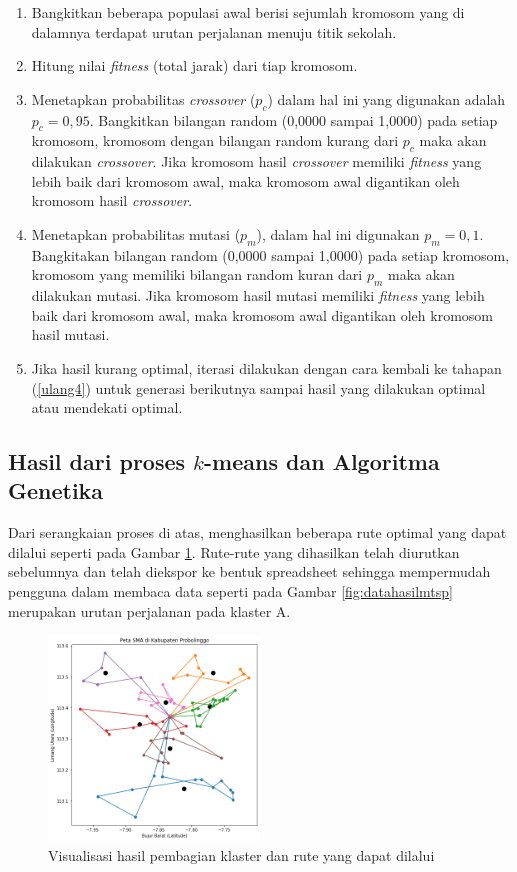 \begin{enumerate}
	\item Bangkitkan beberapa populasi awal berisi sejumlah kromosom yang di dalamnya terdapat urutan perjalanan menuju titik sekolah.
	\item \label{ulang4} Hitung nilai \textit{fitness} (total jarak) dari tiap kromosom.
	\item Menetapkan probabilitas \textit{crossover} ($p_c$) dalam hal ini yang digunakan adalah $p_c=0,95$. Bangkitkan bilangan random (0,0000 sampai 1,0000) pada setiap kromosom, kromosom dengan bilangan random kurang dari $p_c$ maka akan dilakukan \textit{crossover}. Jika kromosom hasil \textit{crossover} memiliki \textit{fitness} yang lebih baik  dari kromosom awal, maka kromosom awal digantikan oleh kromosom hasil \textit{crossover}.
	\item Menetapkan probabilitas mutasi ($p_m$), dalam hal ini digunakan $p_m=0,1$. Bangkitakan bilangan random (0,0000 sampai 1,0000) pada setiap kromosom, kromosom yang memiliki bilangan random kuran dari $p_m$ maka akan dilakukan mutasi. Jika kromosom hasil mutasi memiliki \textit{fitness} yang lebih baik dari kromosom awal, maka kromosom awal digantikan oleh kromosom hasil mutasi.
	\item Jika hasil kurang optimal, iterasi dilakukan dengan cara kembali ke tahapan (\ref{ulang4}) untuk generasi berikutnya sampai hasil yang dilakukan optimal atau mendekati optimal.
\end{enumerate}

\subsection{Hasil dari proses \textbf{$k$}-means dan Algoritma Genetika}

Dari serangkaian proses di atas, menghasilkan beberapa rute optimal yang dapat dilalui seperti pada Gambar \ref{fig:vishasilmtsp}. Rute-rute yang dihasilkan telah diurutkan sebelumnya dan telah diekspor ke bentuk spreadsheet sehingga mempermudah pengguna dalam membaca data seperti pada Gambar \ref{fig:datahasilmtsp} merupakan urutan perjalanan pada klaster A.

\begin{figure}[h!]
	\centering
	\includegraphics[width=0.5\textwidth]{hasil mtsp.png}
	\caption{Visualisasi hasil pembagian klaster dan rute yang dapat dilalui}
	\label{fig:vishasilmtsp}
\end{figure}

